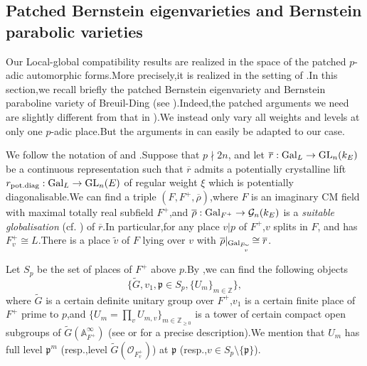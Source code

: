 \documentclass[SecEq,CM,GP]{degruyter-crelle} %
\theoremstyle{plain}
\newcommand{\gal}{{\rm Gal}}
\newcommand{\GLN}{{\rm GL}}
\newcommand{\BA}{{\mathbb{A}}}
\newcommand{\BZ}{{\mathbb{Z}}}
\newcommand{\cG}{\mathcal G}
\newcommand{\cO}{\mathcal O}
\newcommand{\fp}{{\mathfrak{p}}}
\begin{document}
\subsection{Patched Bernstein eigenvarieties and Bernstein parabolic varieties}\label{BENVARPARAVAR}

Our Local-global compatibility results are realized in the space of the patched $p$-adic automorphic forms.\;More precisely,\;it is realized in the setting of \cite[Section 4.1.1]{2019DINGSimple}.\;In this section,\;we recall briefly  the patched Bernstein eigenvariety  and Bernstein paraboline variety  of Breuil-Ding (see \cite[Section 3.3,\;Section 4.2]{Ding2021}).\;Indeed,\;the patched arguments we need are slightly different from that in 
\cite[Section 3.3]{Ding2021}).\;We instead only vary all weights and levels at only one $p$-adic place.\;But the arguments in \cite[Section 3.3,\;Section 4.2]{Ding2021} can easily be adapted to our case.\;

We follow the notation of \cite[Section 4.1.1]{2019DINGSimple} and \cite[Section 2]{PATCHING2016}.\;Suppose that $p\nmid 2n$, and let $\overline{r}: \gal_L \rightarrow \GLN_n(k_E)$ be a continuous representation such that $\overline{r}$ admits a potentially crystalline lift $r_{\mathrm{pot.diag}}: \gal_L \rightarrow \GLN_n(E)$  of regular weight $\xi$ which is potentially diagonalisable.\;We can find a triple $(F,F^+, \overline{\rho})$,\;where $F$ is an imaginary CM field with maximal totally real subfield $F^+$,\;and $\overline{\rho}:\gal_{F^+} \rightarrow \cG_n(k_E)$ is a \emph{suitable globalisation} (cf. \cite[Section 2.1]{PATCHING2016}) of $\overline{r}$.\;In particular,\;for any place $v|p$ of $F^+$,\;$v$ splits in $F$, and has $F^+_v\cong L$.\;There is a place $\widetilde{v}$ of $F$ lying over $v$ with $\overline{\rho}|_{\gal_{F_{\widetilde{v}}}}\cong \overline{r}$.\;

Let $S_p$ be the set of places of $F^+$ above $p$.\;By \cite[Section 2.3]{PATCHING2016},\;we can find the following objects
\begin{equation*}
\{\widetilde{G}, v_1, \fp\in S_p, \{U_m\}_{m\in \BZ}\},
\end{equation*}
where $\widetilde{G}$ is a certain definite unitary group over $F^+$,\;$v_1$ is a certain finite place of $F^+$ prime to $p$,\;and $\{U_m=\prod_{v} U_{m,v}\}_{m\in \BZ_{\geq 0}}$ is a tower of certain compact open subgroups of $\widetilde{G}(\BA_{F^+}^{\infty})$ (see \cite[Section 4.1.1,\;Page 8028]{2019DINGSimple} or \cite[Section 2,\;Page 214]{PATCHING2016} for a precise description).\;We mention that $U_m$ has full level $\fp^m$ (resp.,\;level $\widetilde{G}(\cO_{F^+_v})$) at $\fp$ (resp.,\;$v\in S_p\setminus\{\fp\}$).\;
\end{document}
